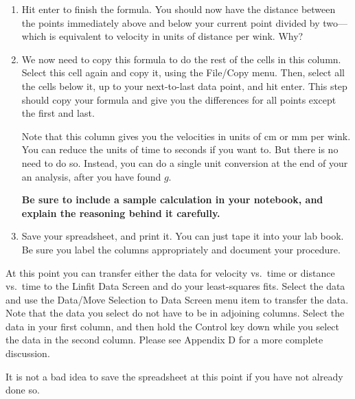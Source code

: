 \begin{enumerate}
\begin{itemize}
{\tt =(D3-D1)/2}

\end{itemize}

\item  Hit enter to finish the formula.  You should now have the
distance between the points immediately above and below your current
point divided by two---which is equivalent to velocity in units of 
distance per wink. Why?

\item  We now need to copy this formula to do the rest of the cells in
this column.  Select this cell again and copy it, using the File/Copy
menu.  Then, select all the cells below it, up to your next-to-last
data point, and hit enter.  This step should copy your formula and give
you the differences for all points except the first and last.

Note that this column gives you the velocities in units of cm or
mm
per wink.  You can reduce the units of time to seconds if you want
to.  But there is no need to do so.  Instead, you can do a single unit
conversion at the end of your an analysis, after you have found $g$.

{\bf Be sure to include a sample calculation in your notebook, and
explain the reasoning behind it carefully.}

\item  Save your spreadsheet, and print it.  You can just tape it into
your lab book.  Be sure you label the columns appropriately and 
document your procedure.

\end{enumerate}

At this point you can transfer either the data for velocity vs.\ time or
distance vs.\ time to the Linfit Data Screen and do your least-squares
fits.  Select the data and use the Data/Move Selection to Data Screen
menu item to transfer the data.
Note that the data you select do not have to be in adjoining columns.
Select the data in your first column, and then hold the Control key
down while you select the data in the second column.  Please see
Appendix D for a more complete discussion.

It is not a bad idea to save the spreadsheet at this
point if you have not already done so.


